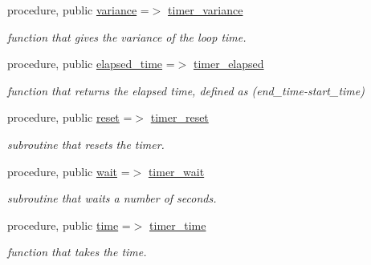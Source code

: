 \begin{DoxyCompactItemize}
procedure, public \hyperlink{structf2k__timer_1_1timer_a5206f3c8107845d257307badf61794dc}{variance} =$>$ \hyperlink{namespacef2k__timer_a2794f7fb1f1084d23939c19d812642ad}{timer\+\_\+variance}
\begin{DoxyCompactList}\small\item\em function that gives the variance of the loop time. \end{DoxyCompactList}\item 
procedure, public \hyperlink{structf2k__timer_1_1timer_aa5aee6ebc58df5de0530d116b321f7fc}{elapsed\+\_\+time} =$>$ \hyperlink{namespacef2k__timer_a2be6741422c75d3280019867de272e19}{timer\+\_\+elapsed}
\begin{DoxyCompactList}\small\item\em function that returns the elapsed time, defined as (end\+\_\+time-\/start\+\_\+time) \end{DoxyCompactList}\item 
procedure, public \hyperlink{structf2k__timer_1_1timer_aaab4196857f9ff36c71ff204b193d399}{reset} =$>$ \hyperlink{namespacef2k__timer_adfb594d0fe1e7b82a416e8b240653c9e}{timer\+\_\+reset}
\begin{DoxyCompactList}\small\item\em subroutine that resets the timer. \end{DoxyCompactList}\item 
procedure, public \hyperlink{structf2k__timer_1_1timer_a03aef1644b9f830aacdd23a01f36e19e}{wait} =$>$ \hyperlink{namespacef2k__timer_a247439a0545b74e9205436b1e39e122e}{timer\+\_\+wait}
\begin{DoxyCompactList}\small\item\em subroutine that waits a number of seconds. \end{DoxyCompactList}\item 
procedure, public \hyperlink{structf2k__timer_1_1timer_a81c3b114f970b623d8f66f8c1e8ba98b}{time} =$>$ \hyperlink{namespacef2k__timer_ac3d2422b80e4fc9939d7bd816dc57c23}{timer\+\_\+time}
\begin{DoxyCompactList}\small\item\em function that takes the time. \end{DoxyCompactList}\end{DoxyCompactItemize}
